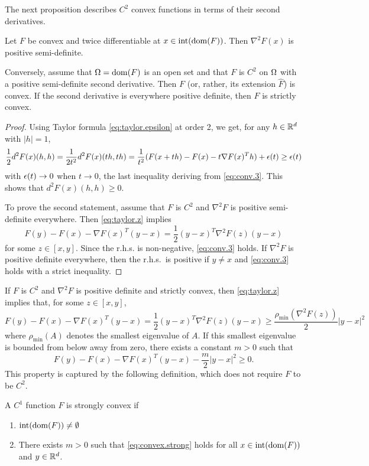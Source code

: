 The next proposition describes $C^2$ convex functions in terms of their second derivatives. 
\begin{proposition}
\label{prop:convex:c2}
Let $F$ be convex and twice differentiable at $x\in \mathrm{int}(\mathrm{dom}(F))$. Then $\nabla^2 F(x)$ is positive semi-definite.

Conversely, assume that $\Omega = \mathrm{dom}(F)$ is an open set and that $F$ is $C^2$ on $\Omega$ with a positive semi-definite second derivative. Then $F$ (or, rather, its extension $\hat F$) is convex. If the second derivative is everywhere positive definite, then $F$ is strictly convex. 
\end{proposition}
\begin{proof}
Using Taylor formula \cref{eq:taylor.epsilon} at order 2, we get, for any $h\in {\mathbb{R}}^d$ with $|h| = 1$,
\[
\frac12 d^2F(x)(h,h) = \frac{1}{2t^2} d^2F(x)(th,th) = \frac{1}{t^2} (F(x+th) - F(x) - t\nabla F(x)^T h) + \epsilon(t) \geq \epsilon(t)
\]
with $\epsilon(t)\to 0$ when $t\to 0$, the last inequality deriving from \cref{eq:conv.3}. This shows that $d^2F(x)(h,h)\geq 0$.


To prove the second statement, assume that  $F$ is $C^2$ and $\nabla^2 F$ is positive semi-definite everywhere. Then \cref{eq:taylor.z} implies 
\[
F(y) - F(x) - \nabla F(x)^T (y-x)  = \frac12 (y-x)^T \nabla^2 F(z) (y-x)
\]
for some $z \in [x,y]$. Since the r.h.s. is non-negative, \cref{eq:conv.3} holds. If $\nabla^2 F$ is positive definite everywhere, then the r.h.s.\ is positive if $y\neq x$ and \cref{eq:conv.3} holds with a strict inequality.
\end{proof}

If $F$ is $C^2$ and $\nabla^2 F$ is positive definite and strictly convex, then \cref{eq:taylor.z} implies that, for some $z\in [x,y]$,
\[
F(y) - F(x) - \nabla F(x)^T (y-x) = \frac12 (y-x)^T \nabla^2 F(z) (y-x) \geq \frac{\rho_{\mathrm{min}}(\nabla^2 F(z))}{2} |y-x|^2
\]
where $\rho_{\mathrm{min}}(A)$ denotes the smallest eigenvalue of $A$. If this smallest eigenvalue is bounded from below away from zero, there exists a constant $m>0$ such that 
\begin{equation}
F(y) - F(x) - \nabla F(x)^T (y-x)  - \frac m2|y-x|^2 \geq 0.
\label{eq:convex.strong}
\end{equation}
This property is captured by the following definition, which does not require $F$ to be $C^2$.
\begin{definition}
\label{def:convex.strong}
A $C^1$ function $F$ is strongly convex if
\begin{enumerate}[label=\arabic*.]
\item $\mathrm{int}(\mathrm{dom}(F))\neq \emptyset$
\item There exists $m>0$ such that \cref{eq:convex.strong} holds for all $x\in \mathrm{int}(\mathrm{dom}(F))$ and $y\in {\mathbb{R}}^d$.
\end{enumerate}
\end{definition}

